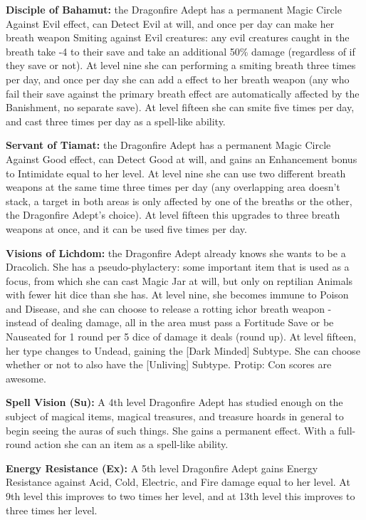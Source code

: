 \begin{itemize*}
\item \textbf{Disciple of Bahamut:} the Dragonfire Adept has a permanent Magic Circle Against Evil effect, can Detect Evil at will, and once per day can make her breath weapon Smiting against Evil creatures: any evil creatures caught in the breath take -4 to their save and take an additional 50\% damage (regardless of if they save or not). At level nine she can performing a smiting breath three times per day, and once per day she can add a  effect to her breath weapon (any who fail their save against the primary breath effect are automatically affected by the Banishment, no separate save). At level fifteen she can smite five times per day, and cast  three times per day as a spell-like ability.
\item \textbf{Servant of Tiamat:} the Dragonfire Adept has a permanent Magic Circle Against Good effect, can Detect Good at will, and gains an Enhancement bonus to Intimidate equal to her level. At level nine she can use two different breath weapons at the same time three times per day (any overlapping area doesn't stack, a target in both areas is only affected by one of the breaths or the other, the Dragonfire Adept's choice). At level fifteen this upgrades to three breath weapons at once, and it can be used five times per day.
\item \textbf{Visions of Lichdom:} the Dragonfire Adept already knows she wants to be a Dracolich. She has a pseudo-phylactery: some important item that is used as a focus, from which she can cast Magic Jar at will, but only on reptilian Animals with fewer hit dice than she has. At level nine, she becomes immune to Poison and Disease, and she can choose to release a rotting ichor breath weapon - instead of dealing damage, all in the area must pass a Fortitude Save or be Nauseated for 1 round per 5 dice of damage it deals (round up). At level fifteen, her type changes to Undead, gaining the [Dark Minded] Subtype. She can choose whether or not to also have the [Unliving] Subtype. Protip: Con scores are awesome.
\end{itemize*}

\textbf{Spell Vision (Su):} A 4th level Dragonfire Adept has studied enough on the subject of magical items, magical treasures, and treasure hoards in general to begin seeing the auras of such things. She gains a permanent  effect. With a full-round action she can  an item as a spell-like ability.

\textbf{Energy Resistance (Ex):} A 5th level Dragonfire Adept gains Energy Resistance against Acid, Cold, Electric, and Fire damage equal to her level. At 9th level this improves to two times her level, and at 13th level this improves to three times her level.

